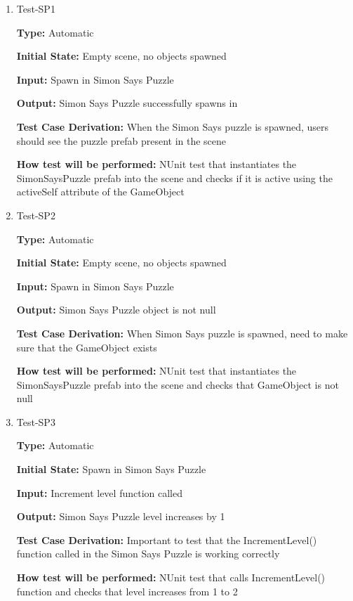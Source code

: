 \documentclass[12pt, titlepage]{article}
\begin{document}
 \begin{enumerate}
 
\item{Test-SP1\\}

\textbf{Type:} Automatic
 
\textbf{Initial State:} Empty scene, no objects spawned

\textbf{Input:} Spawn in Simon Says Puzzle

\textbf{Output:} Simon Says Puzzle successfully spawns in

\textbf{Test Case Derivation:} When the Simon Says puzzle is spawned, users should see the puzzle prefab present in the scene

\textbf{How test will be performed:} NUnit test that instantiates the SimonSaysPuzzle prefab into the scene and checks if it is active using the activeSelf attribute of the GameObject

\item{Test-SP2\\}

\textbf{Type:} Automatic
 
\textbf{Initial State:} Empty scene, no objects spawned

\textbf{Input:} Spawn in Simon Says Puzzle

\textbf{Output:} Simon Says Puzzle object is not null

\textbf{Test Case Derivation:} When Simon Says puzzle is spawned, need to make sure that the GameObject exists

\textbf{How test will be performed:} NUnit test that instantiates the SimonSaysPuzzle prefab into the scene and checks that GameObject is not null

\item{Test-SP3\\}

\textbf{Type:} Automatic
 
\textbf{Initial State:} Spawn in Simon Says Puzzle

\textbf{Input:} Increment level function called

\textbf{Output:} Simon Says Puzzle level increases by 1

\textbf{Test Case Derivation:} Important to test that the IncrementLevel() function called in the Simon Says Puzzle is working correctly

\textbf{How test will be performed:} NUnit test that calls IncrementLevel() function and checks that level increases from 1 to 2


\end{enumerate}
\end{document}
